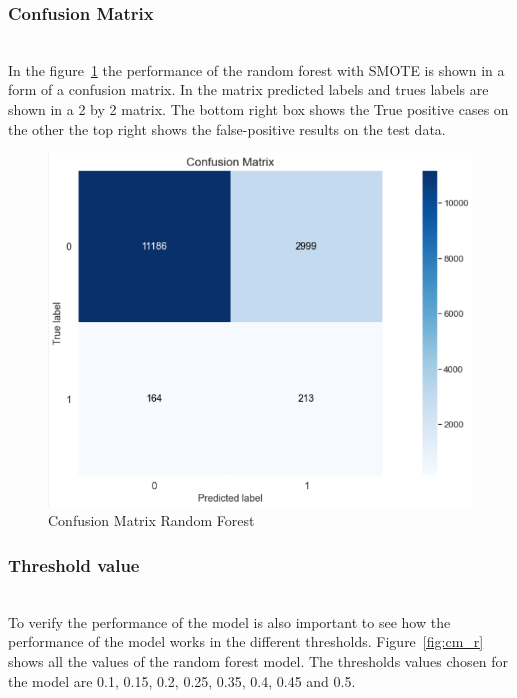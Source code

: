 \subsubsection{Confusion Matrix}\hspace*{\fill} \\
In the figure~\ref{fig:cm_rf} the performance of the random forest with SMOTE is shown in a form of a confusion matrix. In the matrix predicted labels and trues labels are shown in a 2 by 2 matrix. The bottom right box shows the True positive cases on the other the top right shows the false-positive results on the test data. 
\begin{figure}[H]
    \centering
    \includegraphics[width=\linewidth]{figures/cm.PNG}
    \caption{Confusion Matrix Random Forest}
    \label{fig:cm_rf}
\end{figure}


\subsubsection{Threshold value}\hspace*{\fill} \\
To verify the performance of the model is also important to see how the performance of the model works in the different thresholds. Figure~\ref{fig:cm_r} shows all the values of the random forest model. The thresholds values chosen for the model are 0.1, 0.15, 0.2, 0.25, 0.35, 0.4, 0.45 and 0.5. 